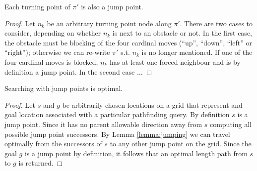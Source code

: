 \begin{corollary}
\label{corollary:turningpoints}
Each turning point of $\pi'$ is also a jump point.
\end{corollary}
\begin{proof}
Let $n_{k}$ be an arbitrary turning point node along $\pi'$. 
There are two cases to consider, depending on whether $n_{k}$ is next
to an obstacle or not.
In the first case, the obstacle must be blocking of the four cardinal 
moves (``up'', ``down'', ``left'' or ``right''); otherwise we can re-write 
$\pi'$ s.t. $n_{k}$ is no longer mentioned.
If one of the four cardinal moves is blocked, $n_{k}$ has at least one
forced neighbour and is by definition a jump point.
In the second case $\ldots$
\end{proof}

\begin{theorem}
\label{theorem:jumpoptimal}
Searching with jump points is optimal.
\end{theorem}
\begin{proof}
Let $s$ and $g$ be arbitrarily chosen locations on a grid that represent
and goal location associated with a particular pathfinding query.
By definition $s$ is a jump point. Since it has no parent 
allowable direction away from $s$ computing all possible jump point successors.
By Lemma \ref{lemma:jumping} we can travel optimally from the
successors of $s$ to any other jump point on the grid.
Since the goal $g$ is a jump point by definition, it follows that an optimal
length path from $s$ to $g$ is returned.
\end{proof}

